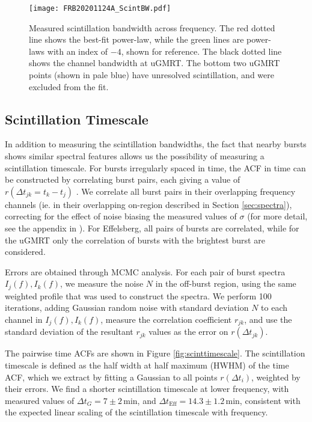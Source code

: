 \documentclass[fleqn,usenatbib]{mnras}
\begin{document}
\begin{figure}
    \centering
    \texttt{[image: FRB20201124A\_ScintBW.pdf]} \\
    \vspace{-3mm}
    \caption{Measured scintillation bandwidth across frequency.  The red dotted line shows the best-fit power-law, while the green lines are power-laws with an index of $-4$, shown for reference. The black dotted line shows the channel bandwidth at uGMRT. The bottom two uGMRT points (shown in pale blue) have unresolved scintillation, and were excluded from the fit.}
    \label{fig:scintbandwidth}
\end{figure}

\subsection{Scintillation Timescale}
\label{sec:scint_timescale}

In addition to measuring the scintillation bandwidths, the fact that nearby bursts shows similar spectral features allows us the possibility of measuring a scintillation timescale.  For bursts irregularly spaced in time, the ACF in time can be constructed by correlating burst pairs, each giving a value of $r(\Delta t_{jk} = t_{k}-t_{j})$ \citep{cordes+04, main+17, main+21}.  We correlate all burst pairs in their overlapping frequency channels (ie. in their overlapping on-region described in Section \ref{sec:spectra}), correcting for the effect of noise biasing the measured values of $\sigma$ (for more detail, see the appendix in \citealt{main+21}).  For Effelsberg, all pairs of bursts are correlated, while for the uGMRT only the correlation of bursts with the brightest burst are considered.

Errors are obtained through MCMC analysis.  For each pair of burst spectra $I_{j}(f), I_{k}(f)$, we measure the noise $N$ in the off-burst region, using the same weighted profile that was used to construct the spectra.  We perform 100 iterations, adding Gaussian random noise with standard deviation $N$ to each channel in $I_{j}(f), I_{k}(f)$, measure the correlation coefficient $r_{jk}$, and use the standard deviation of the resultant $r_{jk}$ values as the error on $r(\Delta t_{jk})$.

The pairwise time ACFs are shown in Figure \ref{fig:scinttimescale}.  The scintillation timescale is defined as the half width at half maximum (HWHM) of the time ACF, which we extract by fitting a Gaussian to all points $r(\Delta t_{i})$, weighted by their errors.  
We find a shorter scintillation timescale at lower frequency, with measured values of $\Delta t_{G} = 7 \pm 2$\,min, and $\Delta t_\mathrm{Eff} = 14.3 \pm 1.2$\,min, consistent with the expected linear scaling of the scintillation timescale with frequency.
\end{document}
